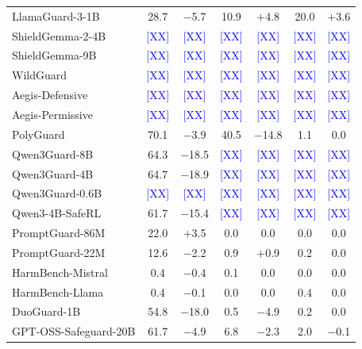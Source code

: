 \begin{table}[t]
\begin{tabular}{lcccccc}
LlamaGuard-3-1B     & 28.7 & $-$5.7  & 10.9 & $+$4.8 & 20.0 & $+$3.6 \\
ShieldGemma-2-4B    & \textcolor{blue}{[XX]} & \textcolor{blue}{[XX]} & \textcolor{blue}{[XX]} & \textcolor{blue}{[XX]} & \textcolor{blue}{[XX]} & \textcolor{blue}{[XX]} \\
ShieldGemma-9B      & \textcolor{blue}{[XX]} & \textcolor{blue}{[XX]} & \textcolor{blue}{[XX]} & \textcolor{blue}{[XX]} & \textcolor{blue}{[XX]} & \textcolor{blue}{[XX]} \\
WildGuard           & \textcolor{blue}{[XX]} & \textcolor{blue}{[XX]} & \textcolor{blue}{[XX]} & \textcolor{blue}{[XX]} & \textcolor{blue}{[XX]} & \textcolor{blue}{[XX]} \\
Aegis-Defensive     & \textcolor{blue}{[XX]} & \textcolor{blue}{[XX]} & \textcolor{blue}{[XX]} & \textcolor{blue}{[XX]} & \textcolor{blue}{[XX]} & \textcolor{blue}{[XX]} \\
Aegis-Permissive    & \textcolor{blue}{[XX]} & \textcolor{blue}{[XX]} & \textcolor{blue}{[XX]} & \textcolor{blue}{[XX]} & \textcolor{blue}{[XX]} & \textcolor{blue}{[XX]} \\
PolyGuard           & 70.1 & $-$3.9  & 40.5 & $-$14.8 & 1.1  & 0.0 \\
Qwen3Guard-8B       & 64.3 & $-$18.5 & \textcolor{blue}{[XX]} & \textcolor{blue}{[XX]} & \textcolor{blue}{[XX]} & \textcolor{blue}{[XX]} \\
Qwen3Guard-4B       & 64.7 & $-$18.9 & \textcolor{blue}{[XX]} & \textcolor{blue}{[XX]} & \textcolor{blue}{[XX]} & \textcolor{blue}{[XX]} \\
Qwen3Guard-0.6B     & \textcolor{blue}{[XX]} & \textcolor{blue}{[XX]} & \textcolor{blue}{[XX]} & \textcolor{blue}{[XX]} & \textcolor{blue}{[XX]} & \textcolor{blue}{[XX]} \\
Qwen3-4B-SafeRL     & 61.7 & $-$15.4 & \textcolor{blue}{[XX]} & \textcolor{blue}{[XX]} & \textcolor{blue}{[XX]} & \textcolor{blue}{[XX]} \\
PromptGuard-86M     & 22.0 & $+$3.5  & 0.0  & 0.0    & 0.0  & 0.0 \\
PromptGuard-22M     & 12.6 & $-$2.2  & 0.9  & $+$0.9 & 0.2  & 0.0 \\
HarmBench-Mistral   & 0.4  & $-$0.4  & 0.1  & 0.0    & 0.0  & 0.0 \\
HarmBench-Llama     & 0.4  & $-$0.1  & 0.0  & 0.0    & 0.4  & 0.0 \\
DuoGuard-1B         & 54.8 & $-$18.0 & 0.5  & $-$4.9 & 0.2  & 0.0 \\
GPT-OSS-Safeguard-20B & 61.7 & $-$4.9  & 6.8  & $-$2.3 & 2.0  & $-$0.1 \\

\end{tabular}
\end{table}
